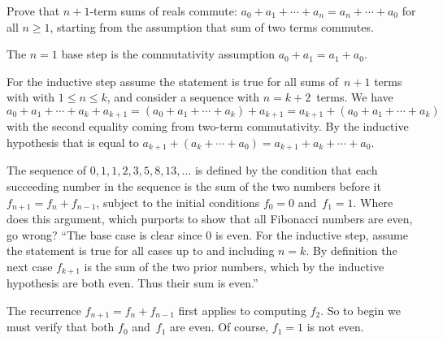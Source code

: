 \documentclass{test}  %
\begin{document}
\begin{problem}

\end{problem}

\begin{problem}
Prove that $n+1$-term sums of reals commute:
$a_0+a_1+\cdots+a_n=a_n+\cdots+a_0$ for all $n\geq 1$,
starting from the assumption that sum of two terms commutes.
\begin{answer}
The $n=1$ base step is the commutativity assumption $a_0+a_1=a_1+a_0$.

For the inductive step assume the statement is true for all 
sums of~$n+1$ terms with 
with $1\leq n\leq k$, and consider a sequence with $n=k+2$~terms.
We have 
$a_0+a_1+\cdots+a_k+a_{k+1}
=(a_0+a_1+\cdots+a_k)+a_{k+1}
=a_{k+1}+(a_0+a_1+\cdots+a_k)$ with the second equality coming from
two-term commutativity.
By the inductive hypothesis that is equal to 
$a_{k+1}+(a_k+\cdots+a_0)=a_{k+1}+a_k+\cdots+a_0$.
\end{answer}
\end{problem}

\begin{problem}
The sequence of 
$0,1,1,2,3,5,8,13, \ldots$ is defined by the condition that 
each succeeding number in the sequence is the sum of the 
two numbers before it $f_{n+1}=f_n+f_{n-1}$, subject to the initial conditions
$f_0=0$ and~$f_1=1$.
Where does this argument, which purports to show that
all Fibonacci numbers are even, go wrong?
``The base case is clear since $0$ is even.  
For the inductive step, assume the statement 
is true for all cases up to and including $n=k$.
By definition 
the next case $f_{k+1}$ is the sum of the two prior numbers, which by
the inductive hypothesis are both even.  
Thus their sum is even.''   
\begin{answer}
The recurrence $f_{n+1}=f_n+f_{n-1}$ first applies to computing $f_2$.
So to begin we must verify that both $f_0$ and~$f_1$ are even.
Of course, $f_1=1$ is not even.
\end{answer}
\end{problem}
\end{document}
